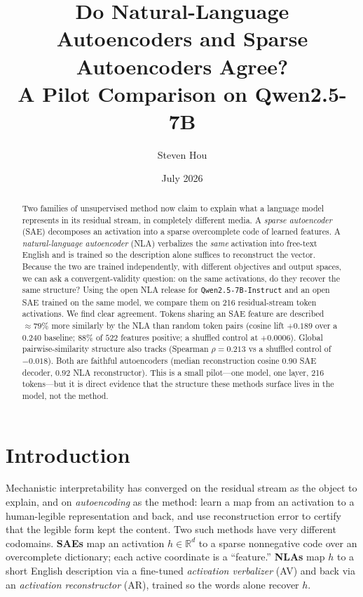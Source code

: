 \documentclass[11pt]{article}
\title{Do Natural-Language Autoencoders and Sparse Autoencoders Agree?\\
       A Pilot Comparison on Qwen2.5-7B}
\author{Steven Hou}
\date{July 2026}
\begin{document}
\maketitle

\begin{abstract}
Two families of unsupervised method now claim to explain what a language model
represents in its residual stream, in completely different media. A
\emph{sparse autoencoder} (SAE) decomposes an activation into a sparse
overcomplete code of learned features. A \emph{natural-language autoencoder}
(NLA) verbalizes the \emph{same} activation into free-text English and is
trained so the description alone suffices to reconstruct the vector. Because the
two are trained independently, with different objectives and output spaces, we
can ask a convergent-validity question: on the same activations, do they recover
the same structure? Using the open NLA release for \texttt{Qwen2.5-7B-Instruct}
and an open SAE trained on the same model, we compare them on 216
residual-stream token activations. We find clear agreement. Tokens sharing an
SAE feature are described ${\approx}79\%$ more similarly by the NLA than random
token pairs (cosine lift $+0.189$ over a $0.240$ baseline; $88\%$ of $522$
features positive; a shuffled control at $+0.0006$). Global pairwise-similarity
structure also tracks (Spearman $\rho = 0.213$ vs a shuffled control of
$-0.018$). Both are faithful autoencoders (median reconstruction cosine $0.90$
SAE decoder, $0.92$ NLA reconstructor). This is a small pilot---one model, one
layer, 216 tokens---but it is direct evidence that the structure these methods
surface lives in the model, not the method.
\end{abstract}

\section{Introduction}
Mechanistic interpretability has converged on the residual stream as the object
to explain, and on \emph{autoencoding} as the method: learn a map from an
activation to a human-legible representation and back, and use reconstruction
error to certify that the legible form kept the content. Two such methods have
very different codomains. \textbf{SAEs} map an activation
$h \in \mathbb{R}^d$ to a sparse nonnegative code over an overcomplete
dictionary; each active coordinate is a ``feature.'' \textbf{NLAs} map $h$ to a
short English description via a fine-tuned \emph{activation verbalizer} (AV) and
back via an \emph{activation reconstructor} (AR), trained so the words alone
recover $h$.
\end{document}
